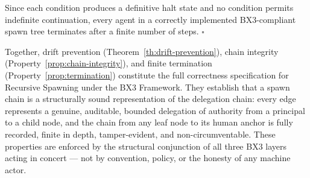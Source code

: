 \begin{Proof}
Since each condition produces a definitive halt state and no condition permits indefinite continuation, every agent in a correctly implemented BX3-compliant spawn tree terminates after a finite number of steps. $\square$
\end{Proof}

\medskip
\noindent Together, drift prevention (Theorem~\ref{th:drift-prevention}), chain integrity (Property~\ref{prop:chain-integrity}), and finite termination (Property~\ref{prop:termination}) constitute the full correctness specification for Recursive Spawning under the BX3 Framework. They establish that a spawn chain is a structurally sound representation of the delegation chain: every edge represents a genuine, auditable, bounded delegation of authority from a principal to a child node, and the chain from any leaf node to its human anchor is fully recorded, finite in depth, tamper-evident, and non-circumventable. These properties are enforced by the structural conjunction of all three BX3 layers acting in concert --- not by convention, policy, or the honesty of any machine actor.